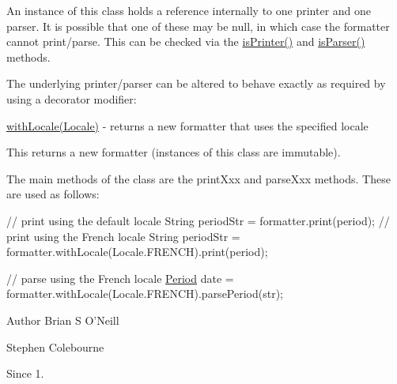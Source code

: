 An instance of this class holds a reference internally to one printer and one parser. It is possible that one of these may be null, in which case the formatter cannot print/parse. This can be checked via the \hyperlink{classorg_1_1joda_1_1time_1_1format_1_1_period_formatter_a6961b2011920ee9388f5cbbfb2bc822c}{is\-Printer()} and \hyperlink{classorg_1_1joda_1_1time_1_1format_1_1_period_formatter_a70eab0f438011894c9502a4bc0918093}{is\-Parser()} methods. 

The underlying printer/parser can be altered to behave exactly as required by using a decorator modifier\-: 
\begin{DoxyItemize}
\item \hyperlink{classorg_1_1joda_1_1time_1_1format_1_1_period_formatter_a179579f429bc0ef9e2c1901e384dc851}{with\-Locale(\-Locale)} -\/ returns a new formatter that uses the specified locale 
\end{DoxyItemize}This returns a new formatter (instances of this class are immutable). 

The main methods of the class are the {\ttfamily print\-Xxx} and {\ttfamily parse\-Xxx} methods. These are used as follows\-: 
\begin{DoxyPre}
// print using the default locale
String periodStr = formatter.print(period);
// print using the French locale
String periodStr = formatter.withLocale(Locale.FRENCH).print(period);\end{DoxyPre}



\begin{DoxyPre}// parse using the French locale
\hyperlink{classorg_1_1joda_1_1time_1_1_period}{Period} date = formatter.withLocale(Locale.FRENCH).parsePeriod(str);
\end{DoxyPre}


\begin{DoxyAuthor}{Author}
Brian S O'Neill 

Stephen Colebourne 
\end{DoxyAuthor}
\begin{DoxySince}{Since}
1. 
\end{DoxySince}


